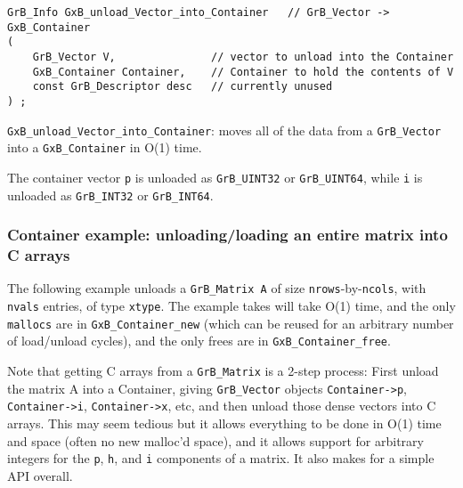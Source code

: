 \begin{mdframed}[userdefinedwidth=6in]
{\footnotesize
\begin{verbatim}
GrB_Info GxB_unload_Vector_into_Container   // GrB_Vector -> GxB_Container
(
    GrB_Vector V,               // vector to unload into the Container
    GxB_Container Container,    // Container to hold the contents of V
    const GrB_Descriptor desc   // currently unused
) ;
\end{verbatim}
} \end{mdframed}

\verb'GxB_unload_Vector_into_Container': moves all of the data from
a \verb'GrB_Vector' into a \verb'GxB_Container' in O(1) time.

The container vector \verb'p' is unloaded as \verb'GrB_UINT32' or \verb'GrB_UINT64',
while \verb'i' is unloaded as \verb'GrB_INT32' or \verb'GrB_INT64'.

\subsubsection{Container example: unloading/loading an entire matrix into C arrays}
\label{container_example}

The following example unloads a
\verb'GrB_Matrix A' of size \verb'nrows'-by-\verb'ncols',
with \verb'nvals' entries, of type \verb'xtype'.  The example takes will take O(1) time,
and the only \verb'mallocs' are in \verb'GxB_Container_new' (which can be reused for
an arbitrary number of load/unload cycles), and the only frees are in
\verb'GxB_Container_free'.

Note that getting C arrays from a \verb'GrB_Matrix' is a 2-step process:
First unload the matrix A into a Container, giving \verb'GrB_Vector' objects
\verb'Container->p',
\verb'Container->i', \verb'Container->x', etc, and then unload those dense vectors into
C arrays.  This may seem tedious but it allows everything to be done in
O(1) time and space (often no new malloc'd space), and it allows support for
arbitrary integers for the \verb'p', \verb'h', and \verb'i' components of a matrix.
It also makes for a simple API overall.

